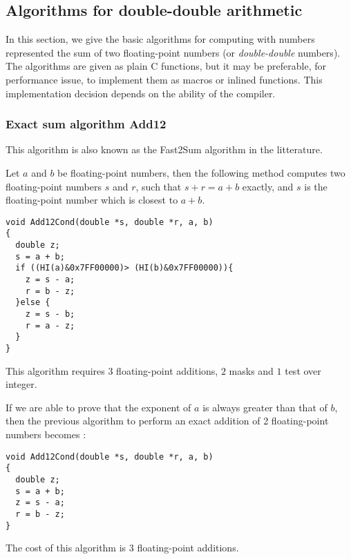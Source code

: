 \subsection{Algorithms for double-double arithmetic}

In this section, we give the basic algorithms for computing with
numbers represented the sum of two floating-point numbers (or
\emph{double-double} numbers). The algorithms are given as plain C
functions, but it may be preferable, for performance issue, to
implement them as macros or inlined functions. This implementation
decision depends on the ability of the compiler.


\subsubsection{Exact sum algorithm {Add12}}

This algorithm is also known as the Fast2Sum algorithm in the litterature.
\begin{theorem}
  Let $a$ and $b$ be floating-point numbers, then the following method
  computes two floating-point numbers $s$ and $r$, such that $s+r =
  a+b$ exactly, and $s$ is the floating-point number which is closest
  to $a+b$.

\begin{lstlisting}[label={lst:Add12Cond},caption={Add12Cond},firstnumber=1]
void Add12Cond(double *s, double *r, a, b) 
{
  double z;
  s = a + b;            
  if ((HI(a)&0x7FF00000)> (HI(b)&0x7FF00000)){  
    z = s - a;           
    r = b - z;           
  }else {                 
    z = s - b;           
    r = a - z;           
  } 
}                         
\end{lstlisting}
This algorithm requires $3$ floating-point additions, $2$ masks and $1$ test over integer.
\end{theorem}


If we are able to prove that  the exponent of $a$ is always greater than that
of $b$, then the previous algorithm to perform an exact addition of 2
floating-point numbers becomes :
\begin{lstlisting}[label={lst:Add12},caption={Add12},firstnumber=1]
void Add12Cond(double *s, double *r, a, b) 
{
  double z;
  s = a + b;            
  z = s - a;  
  r = b - z; 
}            
\end{lstlisting}
The cost of this algorithm is $3$ floating-point additions.






